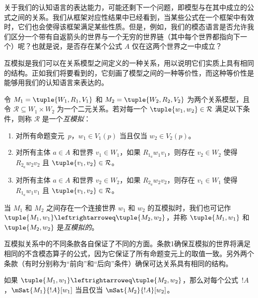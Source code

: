 \documentclass[../../../include/open-logic-section]{subfiles}
\begin{document}


关于我们的认知语言的表达能力，可能还剩下一个问题，即模型与在其中成立的公式之间的关系。我们从框架对应性结果中已经看到，当某些公式在一个框架中有效时，它们也会使得该框架满足某些性质。但是，例如，我们的模态语言是否允许我们区分一个带有自返箭头的世界与一个无穷的世界链（其中每个世界都指向下一个）呢？也就是说，是否存在某个公式 $A$ 仅在这两个世界之一中成立？

互模拟是我们可以在关系模型之间定义的一种关系，用以说明它们实质上具有相同的结构。正如我们将要看到的，它刻画了模型之间的一种等价性，而这种等价性是能够用我们的认知语言来表达的。

\begin{defn}[互模拟]
令 $M_1 = \tuple{W_1, R_1, V_1}$ 和 $M_2 = \tuple{W_2, R_2, V_2}$ 为两个关系模型，且令 $\mathcal{R} \subseteq W_1 \times W_2$ 为一个二元关系。若对每一个 $\tuple{w_1, w_2} \in \mathcal{R}$ 满足以下条件，则称 $\mathcal{R}$ 是一个\emph{互模拟}：

\begin{enumerate}
  \item 对所有命题变元~$p$，$w_1 \in V_1(p)$ 当且仅当 $w_2 \in V_2(p)$。
  \item 对所有主体 $a \in A$ 和世界 $v_1 \in W_1$，如果 $R_{1_a} w_1 v_1$，则存在 $v_2 \in W_2$ 使得 $R_{2_a} w_2 v_2$ 且 $\tuple{v_1, v_2} \in
  \mathcal{R}$。
  \item 对所有主体 $a \in A$ 和世界 $v_2 \in W_2$，如果 $R_{2_a} w_2 v_2$，则存在 $v_1 \in W_1$ 使得 $R_{1_a} w_1 v_1$ 且 $\tuple{v_1, v_2} \in
   \mathcal{R}$。
\end{enumerate}

当 $M_1$ 和 $M_2$ 之间存在一个连接世界 $w_1$ 和 $w_2$ 的互模拟时，我们也可记作 $\tuple{M_1, w_1} \leftrightarroweq
\tuple{M_2, w_2}$，并称 $\tuple{M_1, w_1}$ 和 $\tuple{M_2, w_2}$ 是\emph{互模拟的}。
\end{defn}

互模拟关系中的不同条款各自保证了不同的方面。条款1确保互模拟的世界将满足相同的不含模态算子的公式，因为它保证了所有命题变元上的取值一致。另外两个条款（有时分别称为“前向”和“后向”条件）确保可达关系具有相同的结构。

\begin{thm}
如果 $\tuple{M_1, w_1} \leftrightarroweq \tuple{M_2, w_2}$，那么对每个公式~$!A$，$\mSat{M_1}{!A}[w_1]$ 当且仅当 $\mSat{M_2}{!A}[w_2]$。
\end{thm}
\end{document}
